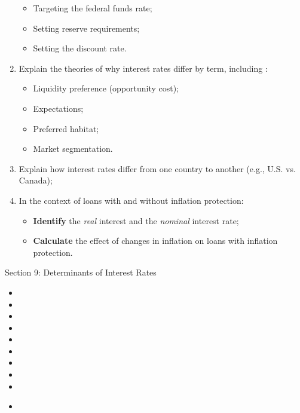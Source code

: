\begin{outcomes}
\begin{enumerate}[label = \alph*)]
\begin{itemize}
		\item	Targeting the federal funds rate;
		\item	Setting reserve requirements;
		\item	Setting the discount rate.
		\end{itemize}
	\item	Explain the theories of why interest rates differ by term, including :
		\begin{itemize}
		\item	Liquidity preference (opportunity cost);
		\item	Expectations;
		\item	Preferred habitat; 
		\item	Market segmentation.
		\end{itemize}
	\item	Explain how interest rates differ from one country to another (e.g., U.S. vs. Canada);
	\item	In the context of loans with and without inflation protection:
		\begin{itemize}
		\item	\textbf{Identify} the \textit{real} interest and the \textit{nominal} interest rate;
		\item	\textbf{Calculate} the effect of changes in inflation on loans with inflation protection.
		\end{itemize}
\end{enumerate}
\end{outcomes}

\begin{ASM_chapter}
Section 9: Determinants of Interest Rates
\begin{itemize}
	\item	{}
	\item	{}
	\item	{}
	\item	{}
	\item	{}
	\item	{}
	\item	{}
	\item	{}
	\item	{}
\end{itemize}
\end{ASM_chapter}

\begin{YTB_vids}
\begin{itemize}
	\item	
\end{itemize}
\end{YTB_vids}

